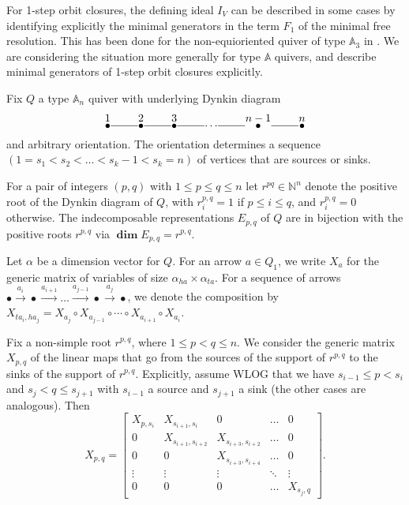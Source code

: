 \documentclass[twoside]{article}
\newcommand{\disp}{\displaystyle}
\newcommand{\nat}{\mathbb{N}}
\DeclareMathOperator{\Dim}{\mathbf{dim}}
\newcommand{\A}{\mathbb{A}}
\theoremstyle{definition}
\begin{document}
For 1-step orbit closures, the defining ideal $I_V$ can be described in some cases by identifying explicitly the minimal generators in the term $F_1$ of the minimal free resolution. This has been done for the non-equioriented quiver of type $\A_3$ in \cite{kavita2}. We are considering the situation more generally for type $\A$ quivers, and describe minimal generators of 1-step orbit closures explicitly.

Fix $Q$ a type $\A_n$ quiver with underlying Dynkin diagram
\[\xymatrix@M-0.20pc{\stackrel{\disp 1}{\bullet} \ar@{-}[r] & \stackrel{\disp 2}{\bullet} \ar@{-}[r] & \stackrel{\disp 3}{\bullet} \ar@{-}[r] & \cdots \ar@{-}[r] & \stackrel{\disp n-1}{\bullet} \ar@{-}[r] & \stackrel{\disp n}{\bullet} 
}\]
and arbitrary orientation. The orientation determines a sequence $(1=s_1 < s_2 < \dots <s_k-1 < s_k=n)$ of vertices that are sources or sinks. 

For a pair of integers $(p,q)$ with $1\leq p \leq q \leq n$ let $r^{pq}\in\nat^{n}$ denote the positive root  of the Dynkin diagram of $Q$, with $r^{p,q}_i=1$ if $p\leq i\leq q$, and $r^{p,q}_i=0$ otherwise. The indecomposable representations $E_{p,q}$ of $Q$ are in bijection with the positive roots $r^{p,q}$ via $\Dim E_{p,q}=r^{p,q}$.

Let $\alpha$ be a dimension vector for $Q$. For an arrow $a\in Q_1$, we write $X_a$ for the generic matrix of variables of size $\alpha_{ha}\times \alpha_{ta}$. For a sequence of arrows $\bullet\xrightarrow{a_i}\bullet\xrightarrow{a_{i+1}}\dots \xrightarrow{a_{j-1}}\bullet \xrightarrow{a_{j}}\bullet$, we denote the composition by $X_{ta_i,ha_j}=X_{a_j}\circ X_{a_{j-1}} \circ \cdots \circ X_{a_{i+1}}\circ X_{a_i}$.

Fix a non-simple root $r^{p,q}$, where $1\leq p < q \leq n$. We consider the generic matrix $X_{p,q}$ of the linear maps that go from the sources of the support of $r^{p,q}$ to the sinks of the support of $r^{p,q}$. Explicitly, assume WLOG that we have $s_{i-1}\leq p <s_i$ and $s_j < q \leq s_{j+1}$ with $s_{i-1}$ a source and $s_{j+1}$ a sink (the other cases are analogous). Then
\[X_{p,q}=
\begin{bmatrix}
X_{p,s_i} & X_{s_{i+1},s_i} & 0 & \dots & 0 \\
 0 & X_{s_{i+1},s_{i+2}} & X_{s_{i+3},s_{i+2}} & \dots & 0 \\
 0 & 0 & X_{s_{i+3},s_{i+4}} & \dots & 0 \\
 \vdots & \vdots & \vdots & \ddots &\vdots\\
 0 & 0 & 0 & \dots & X_{s_j,q} 
\end{bmatrix}.
\]
\end{document}
